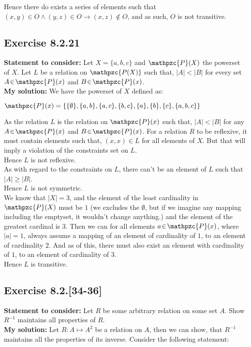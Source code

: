 \documentclass{report}
\newcommand{\cent}[1]{\begin{center}#1\end{center}}
\newcommand{\In}{\! \in \!}
\newcommand{\script}[1]{\mathpzc{#1}}
\newcommand{\assignmentDescription}{\textbf{Statement to consider: }}
\newcommand{\solution}{\textbf{My solution: }}
\newcommand{\Exercise}[1]{\subsection{Exercise #1}}
\begin{document}
	 Hence there do exists a series of elements such that $(x,y) \In O \wedge (y,z) \In O \to (x,z) \notin O$, and as such, $O$ is not transitive.
	 
	 \Exercise{8.2.21}
	 
 	\assignmentDescription
 	Let $X=\{a,b,c\}$ and $\script{P}(X)$ the powerset of $X$. Let $L$ be a relation on $\script{P(X)}$ such that, $|A| < |B|$ for every set $A \In \script{P}(x)$ and $B \In \script{P}(x) $.\\

	\solution
	We have the powerset of $X$ defined as:
	
	\cent{$\script{P}(x) = \{\{\emptyset\},\{a,b\},\{a,c\},\{b,c\},\{a\},\{b\},\{c\},\{a,b,c\}\}$}
	
	As the relation $L$ is the relation on $\script{P}(x)$ such that, $|A| < |B|$ for any $A \In \script{P}(x)$ and $B \In \script{P}(x)$. For a relation $R$ to be reflexive, it must contain elements such that, $(x,x) \In L$ for all elements of $X$. But that will imply a violation of the constraints set on $L$.\\
	
	Hence $L$ is not reflexive.\\
	
	As with regard to the constraints on $L$, there can't be an element of $L$ such that $|A| \geq |B| $.\\
	
	Hence $L$ is not symmetric.\\
	
	
	We know that $|X|=3$, and the element of the least cardinality in $\script{P}(X)$ must be $ 1 $ (we excludes the $\emptyset$, but if we imagine any mapping including the emptyset, it wouldn't change anything.) and the element of the greatest cardinal is $3$. Then we can for all elements $a  \In \script{P}(x)$, where $|a| = 1$, always assume a mapping of an element of cardinality of $1$, to an element of cardinality $ 2 $. And as of this, there must also exist an element with cardinality of $1$, to an element of cardinality of $3$.\\
	
	Hence $L$ is transitive.
	
	\Exercise{8.2.[34-36]}
	
	\assignmentDescription
	Let $R$ be some arbitrary relation on some set $A$. Show $R^{-1}$ maintains all properties of $R$.\\
	
	\solution
	Let $R : A \mapsto A^2$ be a relation on $A$, then we can show, that $R^{-1}$ maintains all the properties of its inverse. Consider the following statement:
	
\end{document}
